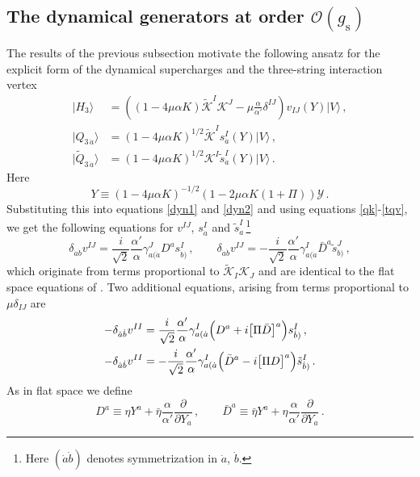 \documentclass[12pt]{article}
\def\da{\dot{a}}
\def\db{\dot{b}}
\def\a{\alpha}
\def\g{\gamma}
\def\d{\delta}
\def\m{\mu}
\def\mc{\mathcal}
\def\p{\partial}
\def\ra{\rangle}
\def\wt{\widetilde}
\numberwithin{equation}{section} \setlength{\textwidth}{17cm}
\begin{document}
\subsection{The dynamical generators at order ${\mc O}(g_{\text{s}})$}\label{sec42}
The results of the previous subsection motivate the following ansatz for the explicit form
of the dynamical supercharges and the three-string interaction vertex
\begin{align}
\label{h}
|H_3\ra & =
\left((1-4\m\a K)\wt{\mc K}^I{\mc K}^J-\m\frac{\a}{\a'}\d^{IJ}\right)v_{IJ}(Y)|V\ra\,,\\
\label{q}
|Q_{3\,\dot{a}}\ra & = (1-4\m\a K)^{1/2}\wt{\mc K}^Is_{\dot{a}}^I(Y)|V\ra\,,\\
\label{tq}
|\wt{Q}_{3\,\dot{a}}\ra & = (1-4\m\a K)^{1/2}{\mc K}^I\tilde{s}_{\dot{a}}^I(Y)|V\ra\,.
\end{align}
Here
\begin{equation}\label{y}
Y\equiv(1-4\m\a K)^{-1/2}(1-2\m\a K(1+\Pi)){\mc Y}\,.
\end{equation}
Substituting this
into equations \eqref{dyn1} and \eqref{dyn2} and using equations \eqref{qk}-\eqref{tqv}, 
we get the following equations for
$v^{IJ}$, $s_{\da}^I$ and $\tilde{s}_{\da}^I$\,\footnote{Here $(\da\db)$ denotes symmetrization in $\da$, $\db$.}
\begin{equation}\label{flat}
\d_{\dot{a}\dot{b}}v^{IJ} =
\frac{i}{\sqrt{2}}\frac{\a'}{\a}\g^J_{a(\dot{a}}D^as^I_{\dot{b})}\,,\qquad
\d_{\dot{a}\dot{b}}v^{IJ} =
-\frac{i}{\sqrt{2}}\frac{\a'}{\a}\g^I_{a(\dot{a}}\bar{D}^a
\tilde{s}^J_{\dot{b})}\,,
\end{equation}
which originate from terms proportional to $\wt{\mc K}_I{\mc K}_J$ and are identical to the flat
space equations of \cite{gsb}.
Two additional equations, arising from terms proportional to $\m\d_{IJ}$ are
\begin{equation}\label{ppwave1}
\begin{split}
-\d_{\dot{a}\dot{b}}v^{II} & =\frac{i}{\sqrt{2}}\frac{\a'}{\a}
\g^I_{a(\dot{a}}\Bigl(D^a+i\bigl[\Pi\bar{D}\bigr]^a\Bigr)s^I_{\dot{b})}\,,\\
-\d_{\dot{a}\dot{b}}v^{II} & = -\frac{i}{\sqrt{2}}\frac{\a'}{\a}
\g^I_{a(\dot{a}}\Bigl(\bar{D}^a-i\bigl[\Pi D\bigr]^a\Bigr)\tilde{s}^I_{\dot{b})}\,.
\end{split}
\end{equation}
As in flat space \cite{gsb} we define
\begin{equation}
D^a\equiv\eta Y^a+\bar{\eta}\frac{\a}{\a'}\frac{\p}{\p Y_a}\,,\qquad
\bar{D}^a\equiv\bar{\eta} Y^a+\eta\frac{\a}{\a'}\frac{\p}{\p Y_a}\,.
\end{equation}
\end{document}
